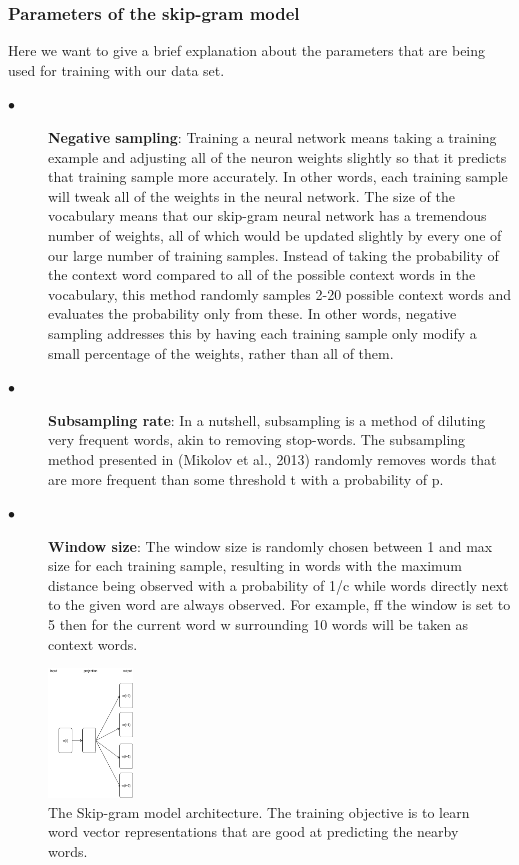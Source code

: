 \subsubsection{Parameters of the skip-gram model}
Here we want to give a brief explanation about the parameters that are being used for training with our data set.
\begin{description}
	\item [$\bullet$] \textbf{Negative sampling}: Training a neural network means taking a training example and adjusting all of the neuron weights slightly so that it predicts that training sample more accurately. In other words, each training sample will tweak all of the weights in the neural network. The size of the vocabulary means that our skip-gram neural network has a tremendous number of weights, all of which would be updated slightly by every one of our large number of training samples. Instead of taking the probability of the context word compared to all of the possible context words in the vocabulary, this method randomly samples 2-20 possible context words and evaluates the probability only from these. In other words, negative sampling addresses this by having each training sample only modify a small percentage of the weights, rather than all of them.
	
	\item [$\bullet$] \textbf{Subsampling rate}: In a nutshell, subsampling is a method of diluting very frequent words, akin to removing stop-words. The subsampling method presented in (Mikolov et al., 2013) \cite{mikolov2013distributed} randomly removes words that are more frequent than some threshold t with a probability of p.
	
	\item [$\bullet$] \textbf{Window size}: The window size is randomly chosen between 1 and max size for each training sample, resulting in words with the maximum distance being observed with a probability of 1/c while words directly next to the given word are always observed. For example, ff the window is set to 5 then for the current word w surrounding 10 words will be taken as context words.
	
\end{description}

\begin{figure}[t!]
	
	\includegraphics[width=0.20\textwidth]{skipgram}
	\caption{The Skip-gram model architecture. The training objective is to learn word vector representations that are good at predicting the nearby words.}
	\label{fig:clf}
\end{figure}

